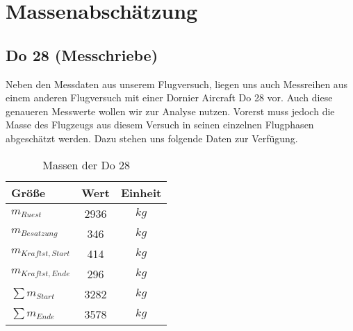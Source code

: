 \chapter{Massenabschätzung}
\label{chapter:masse}

\section{Do 28 (Messchriebe)}
Neben den Messdaten aus unserem Flugversuch, liegen uns auch Messreihen aus einem anderen Flugversuch mit einer Dornier Aircraft Do 28 vor. Auch diese genaueren Messwerte wollen wir zur Analyse nutzen. Vorerst muss jedoch die Masse des Flugzeugs aus diesem Versuch in seinen einzelnen Flugphasen abgeschätzt werden. Dazu stehen uns folgende Daten zur Verfügung. \\

\begin{table}[h]
	\centering
	\begin{tabular}{|l|c|c|}
		\hline
		\textbf{Größe}		 & \textbf{Wert}& \textbf{Einheit} \\ \hline
		$m_{Ruest}$  		 & 2936			& $kg$        \\ \hline
		$m_{Besatzung}$ 	 & 346			& $kg$		  \\ \hline
		$m_{Kraftst,Start}$	 & 414			& $kg$		  \\ \hline
		$m_{Kraftst,Ende}$	 & 296			& $kg$		  \\ \hline
		$\sum m_{Start}$	 & 3282			& $kg$		  \\ \hline
		$\sum m_{Ende}$	 & 3578			& $kg$		   \\ \hline
		
		
		
		
	\end{tabular}
	\caption{Massen der Do 28}
\end{table}


